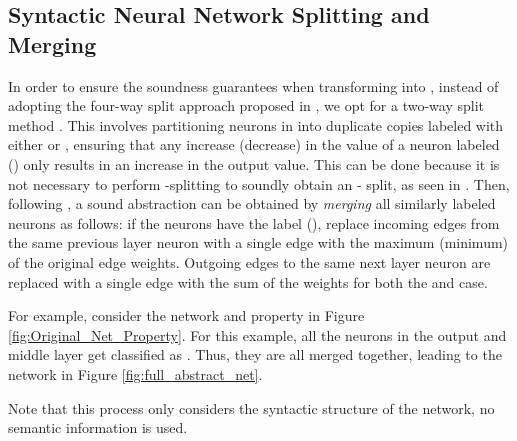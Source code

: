 \subsection{Syntactic Neural Network Splitting and Merging}
\label{s:nn-sam}

In order to ensure the soundness guarantees when transforming \cnc into \abs, 
instead of adopting the four-way split approach proposed in \cite{cegar-nn},
we opt for a two-way split method
\cite{chauhan2022efficiently,liu2022abstraction,10.1145/3644387}. This involves
partitioning neurons in \cnc into duplicate
copies labeled with either {\inc or \dec}, ensuring that any increase 
(decrease) in the value of a neuron labeled \inc (\dec) only results in 
an increase in the output value. This can be done because it is not
necessary to perform \posc-\negc splitting to soundly obtain an \inc-\dec
split, as seen in
\cite{chauhan2022efficiently,liu2022abstraction,10.1145/3644387}. Then,
following \cite{cegar-nn}, a sound 
abstraction can be obtained by \textit{merging} all similarly 
labeled neurons as follows: if the neurons have
the label \inc (\dec), replace incoming edges from the same
previous layer neuron with a single edge with the maximum (minimum) of the
original edge weights. Outgoing edges to the same next layer neuron are replaced
with a single edge with the sum of the weights for both the \inc and \dec case.





For example, consider the network and property in Figure
\ref{fig:Original_Net_Property}. For this example, all the neurons in the output
and middle layer get classified as \inc. Thus, they are all merged together,
leading to the network in Figure \ref{fig:full_abstract_net}.

Note that this process only considers the syntactic structure of the network, no
semantic information is used.


